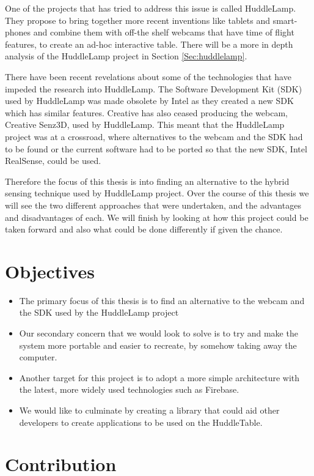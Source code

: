 One of the projects that has tried to address this issue is called HuddleLamp\cite{huddlelamp-paper}. They propose to bring together more recent inventions like tablets and smart-phones and combine them with off-the shelf webcams that have time of flight features, to create an ad-hoc interactive table. There will be a more in depth analysis of the HuddleLamp project in Section \ref{Sec:huddlelamp}.

There have been recent revelations about some of the technologies that have impeded the research into HuddleLamp. The Software Development Kit (SDK) used by HuddleLamp was made obsolete by Intel as they created a new SDK which has similar features. Creative has also ceased producing the webcam, Creative Senz3D, used by HuddleLamp. This meant that the HuddleLamp project was at a crossroad, where alternatives to the webcam and the SDK had to be found or the current software had to be ported so that the new SDK, Intel RealSense\cite{intel-realsense}, could be used.

Therefore the focus of this thesis is into finding an alternative to the hybrid sensing technique used by HuddleLamp project. Over the course of this thesis we will see the two different approaches that were undertaken, and the advantages and disadvantages of each. We will finish by looking at how this project could be taken forward and also what could be done differently if given the chance.


\section{Objectives}

\begin{itemize}
\item The primary focus of this thesis is to find an alternative to the webcam and the SDK used by the HuddleLamp project
\item Our secondary concern that we would look to solve is to try and make the system more portable and easier to recreate, by somehow taking away the computer.
\item Another target for this project is to adopt a more simple architecture with the latest, more widely used technologies such as Firebase.
\item We would like to culminate by creating a library that could aid other developers to create applications to be used on the HuddleTable.
\end{itemize}

\section{Contribution}

